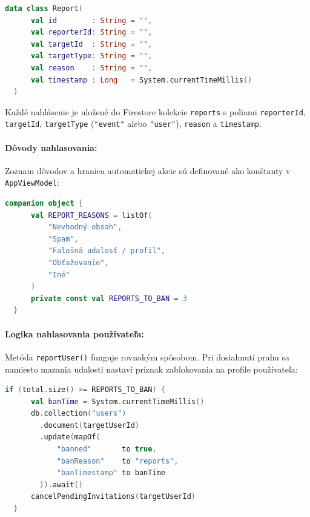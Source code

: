   \begin{lstlisting}[language=Kotlin, caption=Dátová trieda Report]
  data class Report(
      val id        : String = "",
      val reporterId: String = "",
      val targetId  : String = "",
      val targetType: String = "",
      val reason    : String = "",
      val timestamp : Long   = System.currentTimeMillis()
  )
  \end{lstlisting}
  \fi                                                                                                                                                                                                                              

  Každé nahlásenie je uložené do Firestore kolekcie \texttt{reports} s poliami
  \texttt{reporterId}, \texttt{targetId}, \texttt{targetType} (\texttt{"event"}
  alebo \texttt{"user"}), \texttt{reason} a \texttt{timestamp}.

  \paragraph{Dôvody nahlasovania:}
  Zoznam dôvodov a hranica automatickej akcie sú definované ako konštanty
  v \texttt{AppViewModel}:

  \begin{lstlisting}[language=Kotlin, caption=Konštanty systému nahlasovania]
  companion object {
      val REPORT_REASONS = listOf(
          "Nevhodný obsah",
          "Spam",
          "Falošná udalosť / profil",
          "Obťažovanie",
          "Iné"
      )
      private const val REPORTS_TO_BAN = 3
  }
  \end{lstlisting}

 
  


  \paragraph{Logika nahlasovania používateľa:}
  Metóda \texttt{reportUser()} funguje rovnakým spôsobom. Pri dosiahnutí
  prahu sa namiesto mazania udalosti nastaví príznak zablokovania
  na profile používateľa:

  \begin{lstlisting}[language=Kotlin, caption=Automatické zablokovanie používateľa]
  if (total.size() >= REPORTS_TO_BAN) {
      val banTime = System.currentTimeMillis()
      db.collection("users")
        .document(targetUserId)
        .update(mapOf(
            "banned"       to true,
            "banReason"    to "reports",
            "banTimestamp" to banTime
        )).await()
      cancelPendingInvitations(targetUserId)
  }
  \end{lstlisting}

